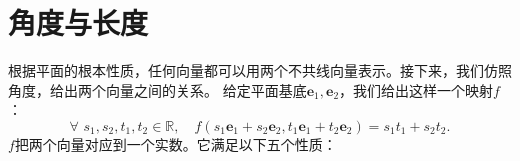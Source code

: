 \documentclass[12pt,UTF8]{ctexbook}
\begin{document}
\section{角度与长度}
根据平面的根本性质，任何向量都可以用两个不共线向量表示。接下来，我们仿照角度，给出两个向量之间的关系。
给定平面基底$\mathbf{e}_1, \mathbf{e}_2$，我们给出这样一个映射$f$：
$$ \forall \,\, s_1, s_2, t_1, t_2 \in \mathbb{R}, \quad f(s_1\mathbf{e}_1 + s_2\mathbf{e}_2, t_1\mathbf{e}_1 + t_2\mathbf{e}_2) = s_1t_1 + s_2 t_2.$$
$f$把两个向量对应到一个实数。它满足以下五个性质：
\end{document}
